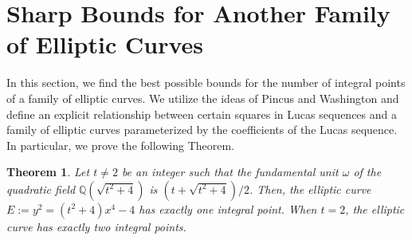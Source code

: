 \documentclass[12pt]{amsart}
\theoremstyle{plain}
\newtheorem{thm}{Theorem}
\theoremstyle{definition}
\theoremstyle{remark}
\numberwithin{equation}{section}
\numberwithin{thm}{section}
\theoremstyle{named}
\theoremstyle{named}
\begin{document}
\section{Sharp Bounds for Another Family of Elliptic Curves}
In this section, we find the best possible bounds for the number of integral points of a family of elliptic curves. We utilize the ideas of {Pincus and Washington} \cite{pincus2024field} and define an explicit relationship between certain squares in Lucas sequences and a family of elliptic curves parameterized by the coefficients of the Lucas sequence. In particular, we prove the following Theorem. 
\begin{thm}\label{NewThm}
Let $t \neq 2$ be an integer such that the fundamental unit $\omega$ of the quadratic field $\mathbb{Q} \left( \sqrt{t^2 + 4} \right)$ is $ \left(t + \sqrt{t^2 + 4} \right)\slash 2$. Then, the elliptic curve $E :=  y^2 = (t^2 + 4)x^4 - 4$ has exactly one integral point. When $t = 2$, the elliptic curve has exactly two integral points. 
 \end{thm}
\end{document}
